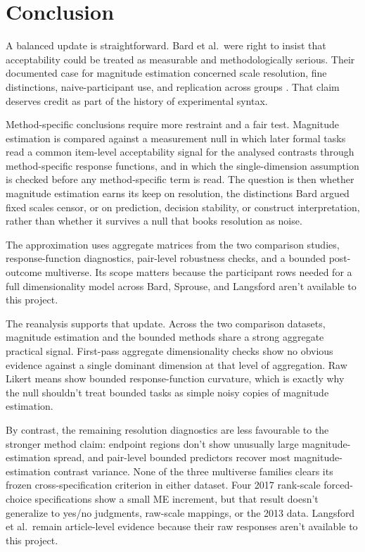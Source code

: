 \section{Conclusion}

A balanced update is straightforward. Bard et al.\ were right to insist that
acceptability could be treated as measurable and methodologically serious. Their documented case
for magnitude estimation concerned scale resolution, fine distinctions,
naive-participant use, and replication across groups
\citep[32]{BardEtAl1996}. That claim deserves credit as part of the
history of experimental syntax.

Method-specific conclusions require more restraint and a fair test.
Magnitude estimation is compared against a measurement null in which later
formal tasks read a common item-level acceptability signal for the analysed
contrasts through method-specific response functions, and in which the
single-dimension assumption is checked before any method-specific term is
read. The question is then whether magnitude estimation earns its keep on
resolution, the distinctions Bard argued fixed scales censor, or on prediction,
decision stability, or construct interpretation, rather than whether it survives
a null that books resolution as noise.

The approximation uses aggregate matrices from the two comparison studies,
response-function diagnostics, pair-level robustness checks, and a bounded post-outcome
multiverse. Its scope matters because the participant rows needed for a full
dimensionality model across Bard, Sprouse, and Langsford aren't available to
this project.

The reanalysis supports that update. Across the two comparison datasets,
magnitude estimation and the bounded methods share a strong aggregate practical
signal. First-pass aggregate
dimensionality checks show no obvious evidence against a single dominant
dimension at that level of aggregation. Raw Likert means show bounded
response-function curvature, which is exactly why the null shouldn't treat
bounded tasks as simple noisy copies of magnitude estimation.

By contrast, the remaining resolution diagnostics are less favourable to the
stronger method claim: endpoint regions don't show unusually large magnitude-estimation
spread, and pair-level bounded predictors recover most magnitude-estimation
contrast variance. None of the three multiverse families clears its frozen
cross-specification criterion in either dataset. Four 2017 rank-scale
forced-choice specifications show a small ME increment, but that result doesn't
generalize to yes/no judgments, raw-scale mappings, or the 2013 data. Langsford
et al.\ remain article-level evidence because their raw responses aren't
available to this project.

